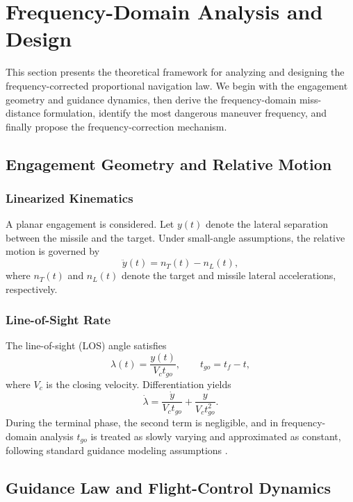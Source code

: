 \documentclass[11pt,a4paper]{article}
\begin{document}
\section{Frequency-Domain Analysis and Design}
\label{sec:analysis}

This section presents the theoretical framework for analyzing and designing the frequency-corrected proportional navigation law. We begin with the engagement geometry and guidance dynamics, then derive the frequency-domain miss-distance formulation, identify the most dangerous maneuver frequency, and finally propose the frequency-correction mechanism.

\subsection{Engagement Geometry and Relative Motion}

\subsubsection{Linearized Kinematics}
A planar engagement is considered. Let $y(t)$ denote the lateral separation between the missile and the target. Under small-angle assumptions, the relative motion is governed by
\begin{equation}
\ddot y(t) = n_T(t) - n_L(t),
\end{equation}
where $n_T(t)$ and $n_L(t)$ denote the target and missile lateral accelerations, respectively.

\subsubsection{Line-of-Sight Rate}
The line-of-sight (LOS) angle satisfies
\begin{equation}
\lambda(t) = \frac{y(t)}{V_c t_{go}}, \qquad t_{go}=t_f-t,
\end{equation}
where $V_c$ is the closing velocity. Differentiation yields
\begin{equation}
\dot\lambda = \frac{\dot y}{V_c t_{go}} + \frac{y}{V_c t_{go}^2}.
\end{equation}
During the terminal phase, the second term is negligible, and in frequency-domain analysis $t_{go}$ is treated as slowly varying and approximated as constant, following standard guidance modeling assumptions \cite{Zarchan1995,Yanushevsky2006}.

\subsection{Guidance Law and Flight-Control Dynamics}
\end{document}
